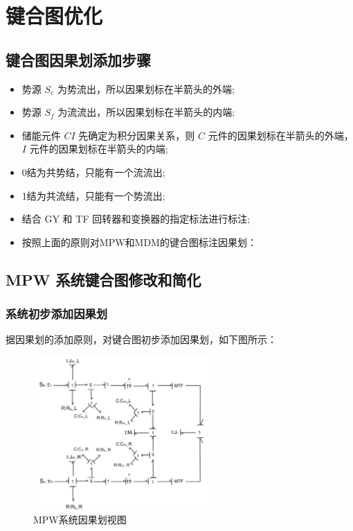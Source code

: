 \clearpage

\setcounter{page}{1}
\cfoot{\thepage}

\section{键合图优化}

\subsection{键合图因果划添加步骤}

\begin{itemize}
	\item 势源 $S_e$ 为势流出，所以因果划标在半箭头的外端;
	\item 势源 $S_f$ 为流流出，所以因果划标在半箭头的内端;
	\item 储能元件 $C I$ 先确定为积分因果关系，则 $C$ 元件的因果划标在半箭头的外端， $I$ 元件的因果划标在半箭头的内端;
	\item 0结为共势结，只能有一个流流出;
	\item 1结为共流结，只能有一个势流出;
	\item 结合 GY 和 TF 回转器和变换器的指定标法进行标注;
	\item 按照上面的原则对MPW和MDM的键合图标注因果划：
\end{itemize}

\subsection{MPW 系统键合图修改和简化}

\subsubsection{系统初步添加因果划}

据因果划的添加原则，对键合图初步添加因果划，如下图所示：
\begin{figure}[H]
	\centering
	\includegraphics[width=0.6\textwidth]{fig/bond/MPW1.png}
	\caption{MPW系统因果划视图 }\label{fig:MPW1}
\end{figure}

